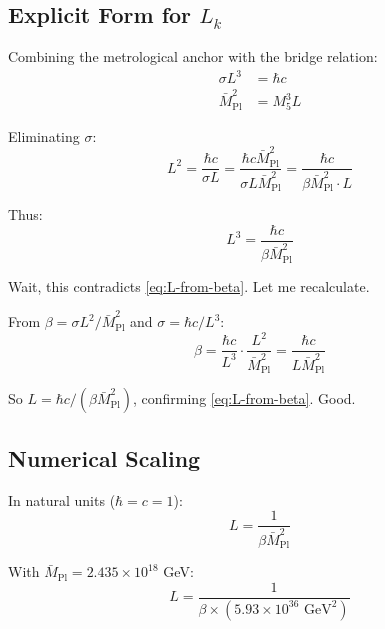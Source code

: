\documentclass[11pt,a4paper]{article}
\begin{document}
\subsection{Explicit Form for $L_k$}

Combining the metrological anchor with the bridge relation:
\begin{align}
  \sigma L^3 &= \hbar c \label{eq:anchor-again} \\
  \bar{M}_{\text{Pl}}^2 &= M_5^3 L \label{eq:bridge-again}
\end{align}

Eliminating $\sigma$:
\begin{equation}
  L^2 = \frac{\hbar c}{\sigma L} = \frac{\hbar c \bar{M}_{\text{Pl}}^2}{\sigma L \bar{M}_{\text{Pl}}^2}
      = \frac{\hbar c}{\beta \bar{M}_{\text{Pl}}^2 \cdot L}
  \label{eq:L2-relation}
\end{equation}

Thus:
\begin{equation}
  L^3 = \frac{\hbar c}{\beta \bar{M}_{\text{Pl}}^2}
  \label{eq:L3-from-beta}
\end{equation}

Wait, this contradicts \eqref{eq:L-from-beta}. Let me recalculate.

From $\beta = \sigma L^2 / \bar{M}_{\text{Pl}}^2$ and $\sigma = \hbar c / L^3$:
\begin{equation}
  \beta = \frac{\hbar c}{L^3} \cdot \frac{L^2}{\bar{M}_{\text{Pl}}^2}
        = \frac{\hbar c}{L \bar{M}_{\text{Pl}}^2}
  \label{eq:beta-verify}
\end{equation}

So $L = \hbar c / (\beta \bar{M}_{\text{Pl}}^2)$, confirming \eqref{eq:L-from-beta}. Good.

\subsection{Numerical Scaling}

In natural units ($\hbar = c = 1$):
\begin{equation}
  L = \frac{1}{\beta \bar{M}_{\text{Pl}}^2}
  \label{eq:L-natural}
\end{equation}

With $\bar{M}_{\text{Pl}} = 2.435 \times 10^{18}$ GeV:
\begin{equation}
  L = \frac{1}{\beta \times (5.93 \times 10^{36} \text{ GeV}^2)}
  \label{eq:L-numeric-form}
\end{equation}
\end{document}
